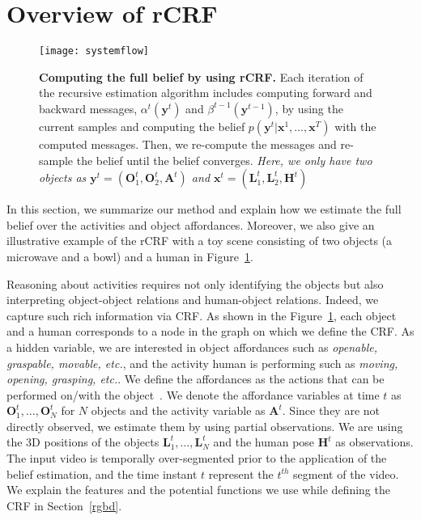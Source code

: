 
\section{Overview of rCRF}
\label{overview}
\begin{figure}[t]
\centering
  \texttt{[image: systemflow]}
  \caption{{\bf Computing the full belief by using rCRF.} Each iteration of the recursive estimation algorithm includes computing forward and backward messages, $\alpha^t(\mathbf{y}^t)$ and $\beta^{t-1}(\mathbf{y}^{t-1})$, by using the current samples and computing the belief $p(\mathbf{y}^t|\mathbf{x}^1,\ldots,\mathbf{x}^T)$ with the computed messages. Then, we re-compute the messages and re-sample the belief until the belief converges. \emph{Here, we only have two objects as  $\mathbf{y}^t=(\mathbf{O}^t_1,\mathbf{O}^t_2,\mathbf{A}^t)$ and $\mathbf{x}^t=(\mathbf{L}^t_1,\mathbf{L}^t_2,\mathbf{H}^t)$ }}
  \label{system}
\end{figure}
In this section, we summarize our method and explain how we estimate the full belief over the activities and object affordances. Moreover, we also give an illustrative example of the rCRF with a toy scene consisting of two objects (a microwave and a bowl) and a human in Figure~\ref{system}.

Reasoning about activities requires not only identifying the objects but also interpreting object-object relations and human-object relations. Indeed, we capture such rich information via CRF. As shown in the Figure~\ref{system}, each object and a human corresponds to a node in the graph on which we define the CRF. As a hidden variable, we are interested in object affordances such as \emph{openable, graspable, movable, etc.}, and the activity human is performing such as \emph{moving, opening, grasping, etc.}. We define the affordances as the actions that can be performed on/with the object~\cite{gibson1979}. We denote the affordance variables at time $t$ as $\mathbf{O}^t_1, \ldots, \mathbf{O}^t_N$ for $N$ objects and the activity variable as $\mathbf{A}^t$. Since they are not directly observed, we estimate them by using partial observations. We are using the 3D positions of the objects $\mathbf{L}^t_1,\ldots,\mathbf{L}^t_N$ and the human pose $\mathbf{H}^t$ as observations. %
The input video is temporally over-segmented prior to the application of the belief estimation, and the time instant $t$ represent the $t^{th}$ segment of the video. We explain the features and the potential functions we use while defining the CRF in Section~\ref{rgbd}.

